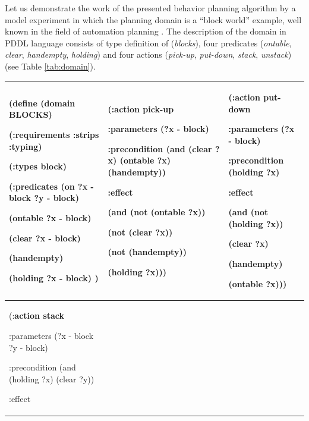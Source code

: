 \documentclass[review]{elsarticle}
\begin{document}
Let us demonstrate the work of the presented behavior planning algorithm by a model experiment in which the planning domain is a ``block world'' example, well known in the field of automation planning \cite{Gupta1992}. The description of the domain in PDDL language \cite{Gerevini2009} consists of type definition of (\textit{blocks}), four predicates (\textit{ontable}, \textit{clear}, \textit{handempty}, \textit{holding}) and four actions (\textit{pick-up}, \textit{put-down}, \textit{stack}, \textit{unstack}) (see Table \ref{tab:domain}).

	\begin{table}
	\footnotesize
	\centering
	\begin{tabular}{|p{}|p{}|p{}|}
		\hline
		(define (\textbf{domain BLOCKS})
		
		(:requirements :strips :typing)
		
		(:types block)
		
		(:predicates (on ?x - block ?y - block)
		
		(ontable ?x - block)
		
		(clear ?x - block)
		
		(handempty)
		
		(holding ?x - block)
		)
		&
		(:\textbf{action pick-up}
		
		:parameters (?x - block)
		
		:precondition (and (clear ?x) (ontable ?x) (handempty))
		
		:effect
		
		(and (not (ontable ?x))
		
		(not (clear ?x))
		
		(not (handempty))
		
		(holding ?x)))
		&
		(:\textbf{action put-down}
		
		:parameters (?x - block)
		
		:precondition (holding ?x)
		
		:effect
		
		(and (not (holding ?x))
		
		(clear ?x)
		
		(handempty)
		
		(ontable ?x)))
		\\
		\hline
		(:\textbf{action stack}
		
		:parameters (?x - block ?y - block)
		
		:precondition (and (holding ?x) (clear ?y))
		
		:effect
		

\end{tabular}
\end{table}
\end{document}
